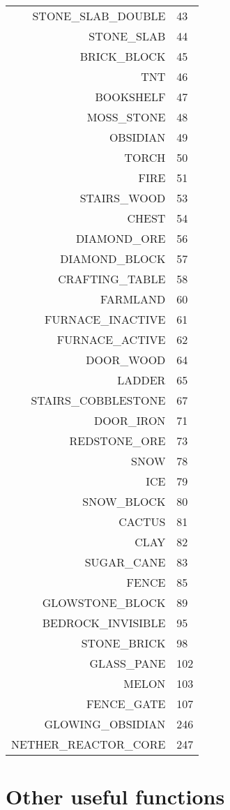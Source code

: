 \begin{appendices}
\begin{tabular}{rl}
				STONE\_SLAB\_DOUBLE & 43 \\
				STONE\_SLAB & 44 \\
				BRICK\_BLOCK & 45 \\
				TNT & 46 \\
				BOOKSHELF & 47 \\
				MOSS\_STONE & 48 \\
				OBSIDIAN & 49 \\
				TORCH & 50 \\
				FIRE & 51 \\
				STAIRS\_WOOD & 53 \\
				CHEST & 54 \\
				DIAMOND\_ORE & 56 \\
				DIAMOND\_BLOCK & 57 \\
				CRAFTING\_TABLE & 58 \\
				FARMLAND & 60 \\
				FURNACE\_INACTIVE & 61 \\
				FURNACE\_ACTIVE & 62 \\
				DOOR\_WOOD & 64 \\
				LADDER & 65 \\
				STAIRS\_COBBLESTONE & 67 \\
				DOOR\_IRON & 71 \\
				REDSTONE\_ORE & 73 \\
				SNOW & 78 \\
				ICE & 79 \\
				SNOW\_BLOCK & 80 \\
				CACTUS & 81 \\
				CLAY & 82 \\
				SUGAR\_CANE & 83 \\
				FENCE & 85 \\
				GLOWSTONE\_BLOCK & 89 \\
				BEDROCK\_INVISIBLE & 95 \\
				STONE\_BRICK & 98 \\
				GLASS\_PANE & 102 \\
				MELON & 103 \\
				FENCE\_GATE & 107 \\
				GLOWING\_OBSIDIAN & 246 \\
				NETHER\_REACTOR\_CORE & 247
			\end{tabular}
			\normalsize

		\section{Other useful functions}


\end{appendices}
